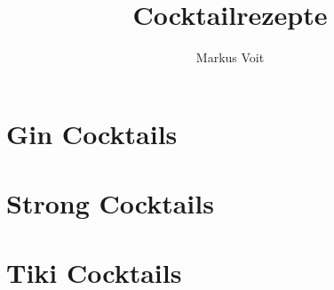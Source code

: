 \documentclass[DIV=11, pagesize, fontsize=11pt, paper=a4, numbers=noenddot]{scrartcl}
\title{Cocktailrezepte}
\author{Markus Voit}
\begin{document}
\maketitle

\tableofcontents
\clearpage

\section{Gin Cocktails}
\newpage{}
\newpage{}

\section{Strong Cocktails}
\newpage{}

\section{Tiki Cocktails}
\newpage{}
\newpage{}
\end{document}
